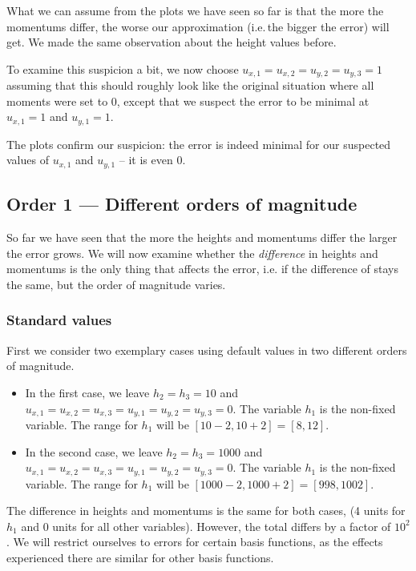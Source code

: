 \documentclass[a4paper, twoside]{article}
\begin{document}
What we can assume from the plots we have seen so far is that the more the momentums differ, the worse our approximation (i.e.\,the bigger the error) will get. We made the same observation about the height values before.

To examine this suspicion a bit, we now choose $u_{x,1}=u_{x,2}=u_{y,2}=u_{y,3}=1$ assuming that this should roughly look like the original situation where all moments were set to 0, except that we suspect the error to be minimal at $u_{x,1}=1$ and $u_{y,1}=1$.



The plots confirm our suspicion: the error is indeed minimal for our suspected values of $u_{x,1}$ and $u_{y,1}$ -- it is even 0.

\clearpage{}

\subsection{Order 1 --- Different orders of magnitude}
\label{sec:ord1-different-orders-magnitude}

So far we have seen that the more the heights and momentums differ the larger the error grows. We will now examine whether the \emph{difference} in heights and momentums is the only thing that affects the error, i.e. if the difference of stays the same, but the order of magnitude varies.

\subsubsection{Standard values}
\label{sec:ord1-diff-ord-magnitude-std-values}

First we consider two exemplary cases using default values in two different orders of magnitude.

\begin{itemize}
\item In the first case, we leave $h_2=h_3=10$ and $u_{x,1}=u_{x,2}=u_{x,3}=u_{y,1}=u_{y,2}=u_{y,3}=0$. The variable $h_1$ is the non-fixed variable. The range for $h_1$ will be $[10-2, 10+2]=[8,12]$.
\item In the second case, we leave $h_2=h_3=1000$ and $u_{x,1}=u_{x,2}=u_{x,3}=u_{y,1}=u_{y,2}=u_{y,3}=0$. The variable $h_1$ is the non-fixed variable. The range for $h_1$ will be $[1000-2, 1000+2]=[998,1002]$.
\end{itemize}

The difference in heights and momentums is the same for both cases, (4 units for $h_1$ and 0 units for all other variables). However, the total differs by a factor of $10^2$. We will restrict ourselves to errors for certain basis functions, as the effects experienced there are similar for other basis functions.
\end{document}
